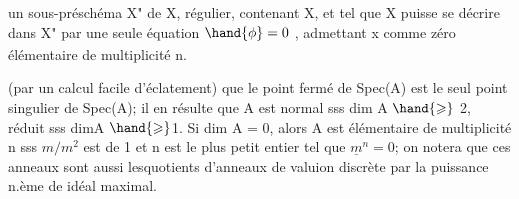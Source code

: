
un sous-préschéma X" de X, régulier,  contenant X, et tel que X
puisse se décrire dans X"\textsubscript{} par une seule équation $\hand{\phi} = 0$ , admettant x comme
zéro  élémentaire de multiplicité n.

(par un calcul facile d'éclatement) que le point fermé de Spec(A) est
le seul point singulier de Spec(A); il en résulte que  A est normal
sss dim A $\hand{\geqslant}$ 2, réduit sss dimA $\hand{\geqslant}$1. Si dim A = 0, alors  A est élémentaire
de multiplicité n sss  $m/m^2$ est de 1 et  n est le plus petit entier
tel que $\underline{m}^n = 0$; on notera que ces anneaux sont aussi lesquotients d'anneaux
de valuion discrète par la puissance n.ème de  idéal maximal.

